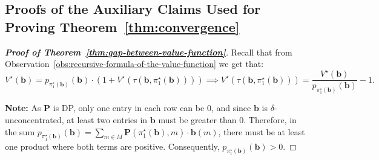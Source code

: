 \subsection{Proofs of the Auxiliary Claims Used for Proving Theorem~\ref{thm:convergence}}

\begin{proof}[\normalfont\bfseries Proof of Theorem~\ref{thm:gap-between-value-function}]
    Recall that from Observation~\ref{obs:recursive-formula-of-the-value-function} we get that:
    \[
        V^{\star}(\bm{b}) = p_{\pi^{\star}_1(\bm{b})}(\bm{b}) \cdot \left( 1 + V^{\star}(\tau(\bm{b}, \pi^{\star}_1(\bm{b}))) \right) \implies V^{\star}(\tau(\bm{b}, \pi^{\star}_1(\bm{b}))) = \frac{V^{\star}(\bm{b})}{p_{\pi^{\star}_1(\bm{b})}(\bm{b})} - 1.
    \]

    \textbf{Note:} As $\bm P$ is DP, only one entry in each row can be $0$, and since $\bm b$ is $\delta$-unconcentrated, at least two entries in $\bm b$ must be greater than $0$. Therefore, in the sum $p_{\pi^{\star}_1(\bm{b})}(\bm{b}) = \sum_{m \in M} \mathbf{P}(\pi^{\star}_1(\mathbf{b}), m) \cdot \mathbf{b}(m)$, there must be at least one product where both terms are positive. Consequently, $p_{\pi^{\star}_1(\bm{b})}(\bm{b}) > 0$.


\end{proof}
